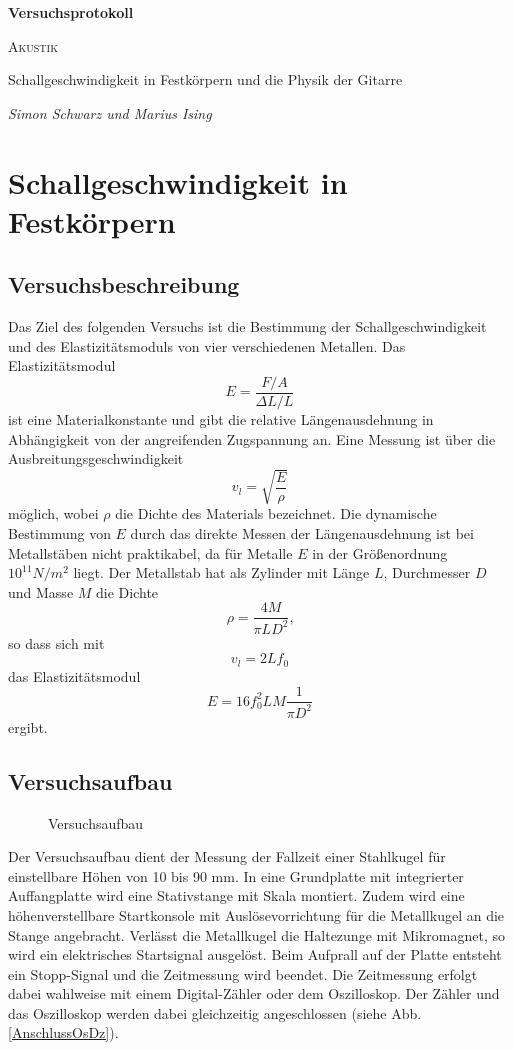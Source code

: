 \documentclass[a4paper, 12pt]{scrartcl}
\begin{document}
\begin{titlepage}
	\centering
	{\Huge\bfseries Versuchsprotokoll\par}
	\vspace{2cm}
	{\scshape\LARGE Akustik \par}
	\vspace{1cm}
	{\Large Schallgeschwindigkeit in Festkörpern und die Physik der Gitarre\par}
	\vfill
	{\large\itshape Simon Schwarz und Marius Ising\par}

	\vfill
\end{titlepage}

\tableofcontents
\newpage

\section{Schallgeschwindigkeit in Festkörpern}


\subsection{Versuchsbeschreibung}

Das Ziel des folgenden Versuchs ist die Bestimmung der Schallgeschwindigkeit und des Elastizitätsmoduls von vier verschiedenen Metallen. Das Elastizitätsmodul 
$$E = \frac{F/A}{\Delta L/L}$$
ist eine Materialkonstante und gibt die relative Längenausdehnung in Abhängigkeit von der angreifenden Zugspannung an. Eine Messung ist über die Ausbreitungsgeschwindigkeit 
$$v_l = \sqrt{\frac{E}{\rho}}$$
möglich, wobei $\rho$ die Dichte des Materials bezeichnet. Die dynamische Bestimmung von $E$ durch das direkte Messen der Längenausdehnung ist bei Metallstäben nicht praktikabel, da für Metalle $E$ in der Größenordnung $10^{11} N/m^2$ liegt. Der Metallstab hat als Zylinder mit Länge $L$, Durchmesser $D$ und Masse $M$ die Dichte
$$\rho = \frac{4M}{\pi LD^2}\text{,}$$
so dass sich mit
$$v_l = 2L f_0$$
das Elastizitätsmodul
$$E = 16 f_0^2 LM \frac{1}{\pi D^2}$$
ergibt.
\subsection{Versuchsaufbau}

\begin{figure}[h]
	\centering
	\caption{Versuchsaufbau}
\end{figure}
Der Versuchsaufbau dient der Messung der Fallzeit einer Stahlkugel für einstellbare Höhen von 10 bis 90 mm. In eine Grundplatte mit integrierter Auffangplatte wird eine Stativstange mit Skala montiert. Zudem wird eine höhenverstellbare Startkonsole mit Auslösevorrichtung für die Metallkugel an die Stange angebracht. Verlässt die Metallkugel die Haltezunge mit Mikromagnet, so wird ein elektrisches Startsignal ausgelöst. Beim Aufprall auf der Platte entsteht ein Stopp-Signal und die Zeitmessung wird beendet. Die Zeitmessung erfolgt dabei wahlweise mit einem Digital-Zähler oder dem Oszilloskop. Der Zähler und das Oszilloskop werden dabei gleichzeitig angeschlossen (siehe Abb. \ref{AnschlussOsDz}).
\end{document}
